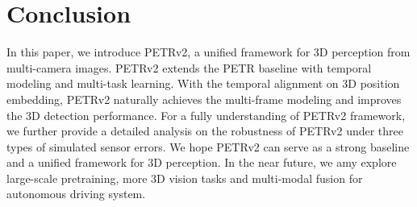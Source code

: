 \documentclass[10pt,twocolumn,letterpaper]{article}
\begin{document}
\section{Conclusion}
In this paper, we introduce PETRv2, a unified framework for 3D perception from multi-camera images. PETRv2 extends the PETR baseline with temporal modeling and multi-task learning. With the temporal alignment on 3D position embedding, PETRv2 naturally achieves the multi-frame modeling and improves the 3D detection performance.
For a fully understanding of PETRv2 framework, we further provide a detailed analysis on the robustness of PETRv2 under three types of simulated sensor errors. We hope PETRv2 can serve as a strong baseline and a unified framework for 3D perception. In the near future, we amy explore large-scale pretraining, more 3D vision tasks and multi-modal fusion for autonomous driving system.

{\small

 
}
\end{document}
